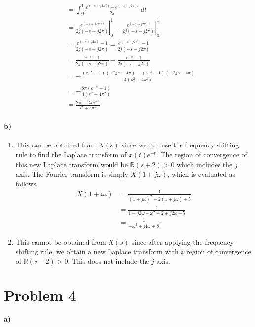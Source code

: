 \documentclass[12pt]{article}
\begin{document}
\begin{enumerate}
\begin{align*}
        &=\int_0^1 \frac{e^{(-s+j2\pi) t}-e^{(-s-j2\pi) t}}{2j}\,dt\\
        &=\left.\frac{e^{(-s+j2\pi) t}}{2j(-s+j2\pi)}\right|_0^1-\left.\frac{e^{(-s-j2\pi) t}}{2j(-s-j2\pi)}\right|_0^1\\
        &=\frac{e^{(-s+j2\pi)}-1}{2j(-s+j2\pi)}-\frac{e^{(-s-j2\pi)}-1}{2j(-s-j2\pi)}\\
        &=\frac{e^{-s}-1}{2j(-s+j2\pi)}-\frac{e^{-s}-1}{2j(-s-j2\pi)}\\
        &=-\frac{(e^{-s}-1)(-2js+4\pi) - (e^{-s}-1)(-2js-4\pi)}{4(s^2+4\pi^2)}\\
        &=-\frac{8\pi(e^{-s}-1)}{4(s^2+4\pi^2)}\\
        &=\frac{2\pi-2\pi e^{-s}}{s^2+4\pi^2}
    \end{align*}
\end{enumerate}

\paragraph{b)}

\begin{enumerate}
    \item This can be obtained from \(X(s)\) since we can use the frequency shifting rule to find the Laplace transform of \(x(t)e^{-t}\). The region of convergence
    of this new Laplace transform would be \(\mathbb{R}(s+2)>0\) which includes the \(j\) axis. The Fourier transform is simply \(X(1+j\omega)\), which is evaluated as
    follows.
    \begin{align*}
        X(1+i\omega)&=\frac{1}{(1+j\omega)^2+2(1+j\omega)+5}\\
        &=\frac{1}{1+j2\omega-\omega^2+2+j2\omega+5}\\
        &=\frac{1}{-\omega^2+j4\omega + 8}
    \end{align*}
    \item This cannot be obtained from \(X(s)\) since after applying the frequency shifting rule, we obtain a new Laplace transform with a region of convergence of \(\mathbb{R}(s-2)>0\).
    This does not include the \(j\) axis.
\end{enumerate}

\section*{Problem 4}

\paragraph{a)}
\end{document}
